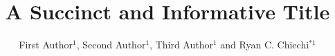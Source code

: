 \title{A Succinct and Informative Title}

\author{First Author$^{1}$, %
	    Second Author$^{1}$, %
	    Third Author$^{1}$ %
	    and Ryan C. Chiechi$^{*1}$%
}
